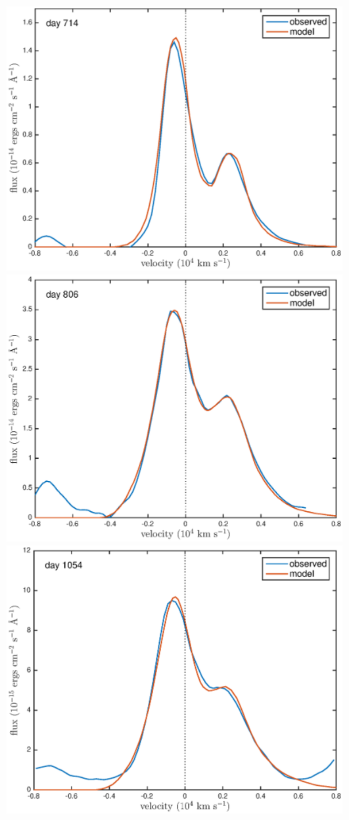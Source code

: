 \documentclass[useAMS,usenatbib,usegraphicx]{mnras}
\begin{document}
\begin{figure}
\begin{center}
\includegraphics[trim =33 10 45 15,clip=true,scale=0.47]{clump_1/maximum/d714OI}
\includegraphics[trim =33 10 45 15,clip=true,scale=0.47]{clump_1/maximum/d806OI}
\includegraphics[trim =33 10 45 15,clip=true,scale=0.47]{clump_1/maximum/d1054OI}

\end{center}
\end{figure}
\end{document}
